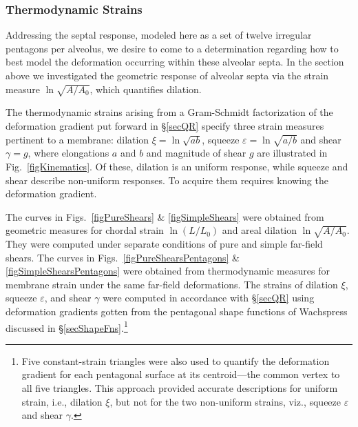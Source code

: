 \subsubsection{Thermodynamic Strains}

Addressing the septal response, modeled here as a set of twelve irregular pentagons per alveolus, we desire to come to a determination regarding how to best model the deformation occurring within these alveolar septa.  In the section above we investigated the geometric response of alveolar septa via the strain measure $\ln \sqrt{A/A_0}$, which quantifies dilation.  

The thermo\-dynamic strains arising from a Gram-Schmidt factorization of the deformation gradient put forward in \S\ref{secQR} specify three strain measures pertinent to a membrane: dilation $\xi = \ln \sqrt{ab}$, squeeze $\varepsilon = \ln \sqrt{a/b}$ and shear $\gamma = g$, where elongations $a$ and $b$ and magnitude of shear $g$ are illustrated in Fig.~\ref{figKinematics}.  Of these, dilation is an uniform response, while squeeze and shear describe non-uniform responses.  To acquire them requires knowing the deformation gradient.

The curves in Figs.~\ref{figPureShears} \& \ref{figSimpleShears} were obtained from geometric measures for chordal strain $\ln (L/L_0)$ and areal dilation $\ln \sqrt{A/A_0}$.  They were computed under separate conditions of pure and simple far-field shears.  The curves in Figs.~\ref{figPureShearsPentagons} \& \ref{figSimpleShearsPentagons} were obtained from thermo\-dynamic measures for membrane strain under the same far-field deformations.  The strains of dilation $\xi$, squeeze $\varepsilon$, and shear $\gamma$ were computed in accordance with \S\ref{secQR} using deformation gradients gotten from the pentagonal shape functions of Wachspress \cite{Wachspress75} discussed in \S\ref{secShapeFns}.\footnote{
	Five constant-strain triangles were also used to quantify the deformation gradient for each pentagonal surface at its centroid---the common vertex to all five triangles.  This approach provided accurate descriptions for uniform strain, i.e., dilation $\xi$, but not for the two non-uniform strains, viz., squeeze $\varepsilon$ and shear $\gamma$.
} 

